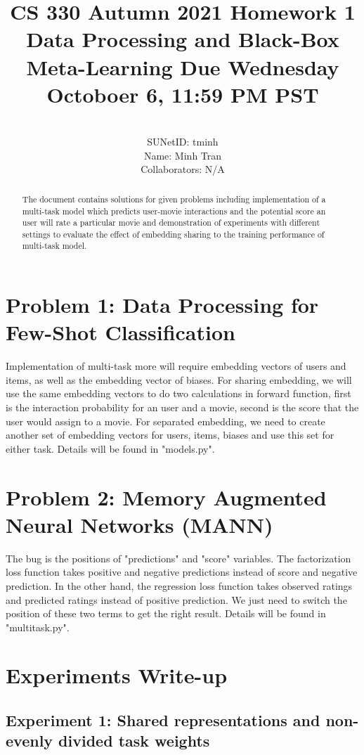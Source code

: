 \documentclass[]{article}
\title{\textbf{CS 330 Autumn 2021 Homework 1}
	{Data Processing and Black-Box Meta-Learning
		Due Wednesday Octoboer 6, 11:59 PM PST}}
\author{
			\\SUNetID: tminh 
			\\Name: Minh Tran 
			\\Collaborators: N/A 
		}
\begin{document}
	
	\maketitle
	
	\begin{abstract}
		
		The document contains solutions for given problems including implementation of a multi-task model which predicts user-movie interactions and the potential score an user will rate a particular movie and demonstration of experiments with different settings to evaluate the effect of embedding sharing to the training performance of multi-task model.
		
	\end{abstract}
	
	\section{Problem 1: Data Processing for Few-Shot Classification}
	Implementation of multi-task more will require embedding vectors of users and items, as well as the embedding vector of biases. For sharing embedding, we will use the same embedding vectors to do two calculations in forward function, first is the interaction probability for an user and a movie, second is the score that the user would assign to a movie. For separated embedding, we need to create another set of embedding vectors for users, items, biases and use this set for either task.
	Details will be found in "models.py".	
	
	\section{Problem 2:  Memory Augmented Neural Networks (MANN)}
	The bug is the positions of "predictions" and "score" variables. The factorization loss function takes positive and negative predictions instead of score and negative prediction. In the other hand, the regression loss function takes observed ratings and predicted ratings instead of positive prediction. We just need to switch the position of these two terms to get the right result.
	Details will be found in "multitask.py".
	
	\section{Experiments Write-up}
	\subsection{Experiment 1: Shared representations and non-evenly divided task weights}
	
\end{document}
